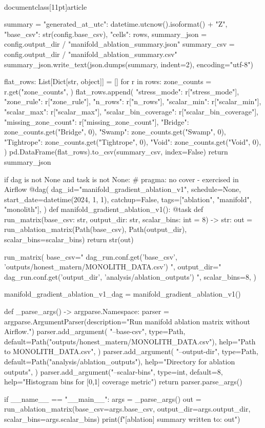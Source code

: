 \\documentclass[11pt]{article}
\begin{document}
\begin{CodeBlock}
    summary = {
        "generated_at_utc": datetime.utcnow().isoformat() + "Z",
        "base_csv": str(config.base_csv),
        "cells": rows,
    }
    summary_json = config.output_dir / "manifold_ablation_summary.json"
    summary_csv = config.output_dir / "manifold_ablation_summary.csv"
    summary_json.write_text(json.dumps(summary, indent=2), encoding="utf-8")

    flat_rows: List[Dict[str, object]] = []
    for r in rows:
        zone_counts = r.get("zone_counts", {})
        flat_rows.append(
            {
                "stress_mode": r["stress_mode"],
                "zone_rule": r["zone_rule"],
                "n_rows": r["n_rows"],
                "scalar_min": r["scalar_min"],
                "scalar_max": r["scalar_max"],
                "scalar_bin_coverage": r["scalar_bin_coverage"],
                "missing_zone_count": r["missing_zone_count"],
                "Bridge": zone_counts.get("Bridge", 0),
                "Swamp": zone_counts.get("Swamp", 0),
                "Tightrope": zone_counts.get("Tightrope", 0),
                "Void": zone_counts.get("Void", 0),
            }
        )
    pd.DataFrame(flat_rows).to_csv(summary_csv, index=False)
    return summary_json


if dag is not None and task is not None:  # pragma: no cover - exercised in Airflow
    @dag(
        dag_id="manifold_gradient_ablation_v1",
        schedule=None,
        start_date=datetime(2024, 1, 1),
        catchup=False,
        tags=["ablation", "manifold", "monolith"],
    )
    def manifold_gradient_ablation_v1():
        @task
        def run_matrix(base_csv: str, output_dir: str, scalar_bins: int = 8) -> str:
            out = run_ablation_matrix(Path(base_csv), Path(output_dir), scalar_bins=scalar_bins)
            return str(out)

        run_matrix(
            base_csv="{{ dag_run.conf.get('base_csv', 'outputs/honest_matern/MONOLITH_DATA.csv') }}",
            output_dir="{{ dag_run.conf.get('output_dir', 'analysis/ablation_outputs') }}",
            scalar_bins=8,
        )

    manifold_gradient_ablation_v1_dag = manifold_gradient_ablation_v1()


def _parse_args() -> argparse.Namespace:
    parser = argparse.ArgumentParser(description="Run manifold ablation matrix without Airflow.")
    parser.add_argument(
        "--base-csv",
        type=Path,
        default=Path("outputs/honest_matern/MONOLITH_DATA.csv"),
        help="Path to MONOLITH_DATA.csv",
    )
    parser.add_argument(
        "--output-dir",
        type=Path,
        default=Path("analysis/ablation_outputs"),
        help="Directory for ablation outputs",
    )
    parser.add_argument("--scalar-bins", type=int, default=8, help="Histogram bins for [0,1] coverage metric")
    return parser.parse_args()


if __name__ == "__main__":
    args = _parse_args()
    out = run_ablation_matrix(base_csv=args.base_csv, output_dir=args.output_dir, scalar_bins=args.scalar_bins)
    print(f"[ablation] summary written to: {out}")

\end{CodeBlock}
\end{document}
